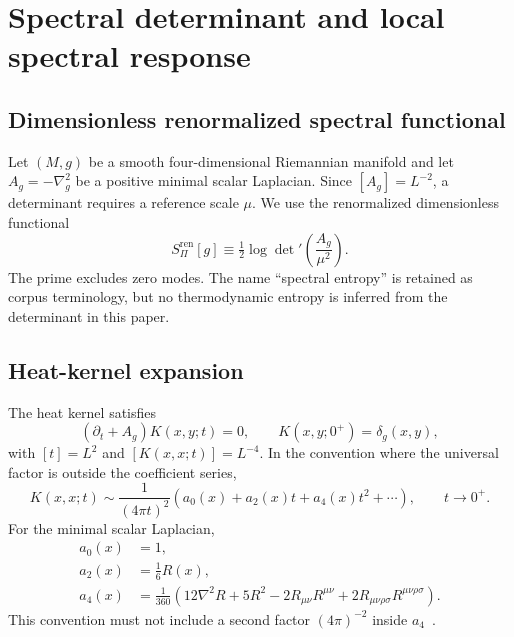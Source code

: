 \documentclass[12pt,a4paper]{article}
\theoremstyle{definition}
\newcommand{\Spi}{S_{\Pi}}
\newcommand{\Ag}{A_g}
\newcommand{\hk}{K}
\newcommand{\half}{\tfrac{1}{2}}
\begin{document}
  \section{Spectral determinant and local spectral response}
    \label{sec:spectral-locality}

    \subsection{Dimensionless renormalized spectral functional}

      Let $(M,g)$ be a smooth four-dimensional Riemannian manifold and let
      $\Ag=-\nabla_g^2$ be a positive minimal scalar Laplacian.
      Since $[\Ag]=L^{-2}$, a determinant requires a reference scale $\mu$.
      We use the renormalized dimensionless functional
      \begin{equation}
        \Spi^{\mathrm{ren}}[g]
        \equiv
        \half\log\det'\!\left(\frac{\Ag}{\mu^2}\right).
        \label{eq:Spi-def}
      \end{equation}
      The prime excludes zero modes.
      The name ``spectral entropy'' is retained as corpus terminology, but no thermodynamic entropy is inferred from
      the determinant in this paper.

    \subsection{Heat-kernel expansion}

      The heat kernel satisfies
      \begin{equation}
        (\partial_t+\Ag)\hk(x,y;t)=0,
        \qquad
        \hk(x,y;0^+)=\delta_g(x,y),
        \label{eq:heat-eq}
      \end{equation}
      with $[t]=L^2$ and $[\hk(x,x;t)]=L^{-4}$.
      In the convention where the universal factor is outside the coefficient series,
      \begin{equation}
        \hk(x,x;t)
        \sim
        \frac{1}{(4\pi t)^2}
        \left(a_0(x)+a_2(x)t+a_4(x)t^2+\cdots\right),
        \qquad t\to0^+.
        \label{eq:hk-expansion}
      \end{equation}
      For the minimal scalar Laplacian,
      \begin{align}
        a_0(x)&=1,
        \label{eq:a0}\\
        a_2(x)&=\frac{1}{6}R(x),
        \label{eq:a2}\\
        a_4(x)&=\frac{1}{360}
        \left(
          12\nabla^2R+5R^2-2R_{\mu\nu}R^{\mu\nu}
          +2R_{\mu\nu\rho\sigma}R^{\mu\nu\rho\sigma}
        \right).
        \label{eq:a4}
      \end{align}
      This convention must not include a second factor $(4\pi)^{-2}$ inside $a_4$~\cite{Vassilevich2003,
      Gilkey1995}.
\end{document}
